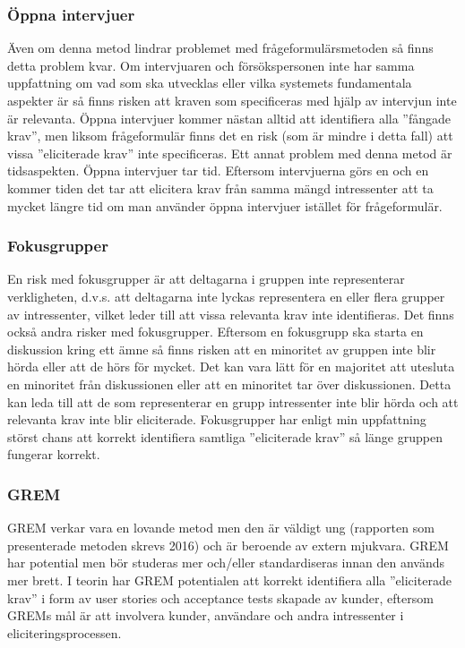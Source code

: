 \subsubsection{Öppna intervjuer}
Även om denna metod lindrar problemet med frågeformulärsmetoden så finns detta problem kvar. Om intervjuaren och försökspersonen inte har samma uppfattning om vad som ska utvecklas eller vilka systemets fundamentala aspekter är så finns risken att kraven som specificeras med hjälp av intervjun inte är relevanta. Öppna intervjuer kommer nästan alltid att identifiera alla ”fångade krav”, men liksom frågeformulär finns det en risk (som är mindre i detta fall) att vissa ”eliciterade krav” inte specificeras. Ett annat problem med denna metod är tidsaspekten. Öppna intervjuer tar tid. Eftersom intervjuerna görs en och en kommer tiden det tar att elicitera krav från samma mängd intressenter att ta mycket längre tid om man använder öppna intervjuer istället för frågeformulär.  

\subsubsection{Fokusgrupper}
En risk med fokusgrupper är att deltagarna i gruppen inte representerar verkligheten, d.v.s. att deltagarna inte lyckas representera en eller flera grupper av intressenter, vilket leder till att vissa relevanta krav inte identifieras. Det finns också andra risker med fokusgrupper. Eftersom en fokusgrupp ska starta en diskussion kring ett ämne så finns risken att en minoritet av gruppen inte blir hörda eller att de hörs för mycket. Det kan vara lätt för en majoritet att utesluta en minoritet från diskussionen eller att en minoritet tar över diskussionen. Detta kan leda till att de som representerar en grupp intressenter inte blir hörda och att relevanta krav inte blir eliciterade. Fokusgrupper har enligt min uppfattning störst chans att korrekt identifiera samtliga ”eliciterade krav” så länge gruppen fungerar korrekt.

\subsubsection{GREM}
GREM verkar vara en lovande metod men den är väldigt ung (rapporten som presenterade metoden skrevs 2016) och är beroende av extern mjukvara. GREM har potential men bör studeras mer och/eller standardiseras innan den används mer brett. I teorin har GREM potentialen att korrekt identifiera alla ”eliciterade krav” i form av user stories och acceptance tests skapade av kunder, eftersom GREMs mål är att involvera kunder, användare och andra intressenter i eliciteringsprocessen.

